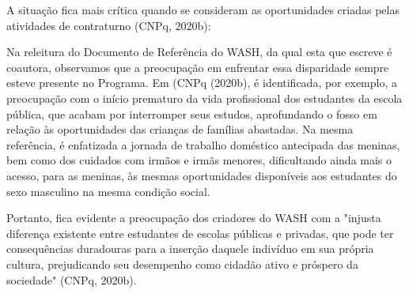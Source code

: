 A situação fica mais crítica quando se consideram as oportunidades criadas pelas atividades de contraturno (CNPq, 2020b):


\noindent\begin{center}\mbox{\centering{}}\end{center}


Na releitura do Documento de Referência do WASH, da qual esta que escreve é coautora, observamos que a preocupação em enfrentar essa disparidade sempre esteve presente no Programa. Em  (CNPq (2020b), é identificada, por exemplo, a preocupação com o início prematuro da vida profissional dos estudantes da escola pública, que acabam por interromper seus estudos, aprofundando o fosso em relação às oportunidades das crianças de famílias abastadas. Na mesma referência, é enfatizada a jornada de trabalho doméstico antecipada  das meninas, bem como dos cuidados com irmãos e irmãs menores, dificultando ainda mais o acesso, para as meninas, às mesmas oportunidades disponíveis aos estudantes do sexo masculino na mesma condição social.

Portanto, fica evidente a preocupação dos criadores do WASH com a "injusta diferença existente entre estudantes de escolas públicas e privadas, que pode ter consequências duradouras para a inserção daquele indivíduo em sua própria cultura, prejudicando seu desempenho como cidadão ativo e próspero da sociedade" (CNPq, 2020b).


\noindent\begin{center}\mbox{\centering{}}\end{center}



